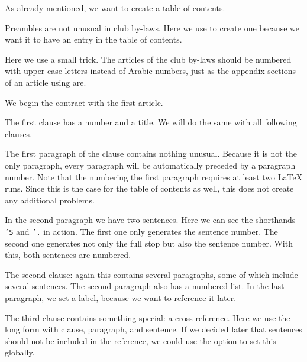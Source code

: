 %
As already mentioned, we want to create a table of contents.

%
Preambles are not unusual in club by-laws. Here we use
 to create one because we want it to have an entry
in the table of contents.

%
Here we use a small trick. The articles of the club by-laws should be numbered
with upper-case letters instead of Arabic numbers, just as 
the appendix sections of an article using  are.

%
We begin the contract with the first article.

%
The first clause has a number and a title. We will do the same with all
following clauses.

The first paragraph of the clause contains nothing unusual. Because it is not
the only paragraph, every paragraph will be automatically preceded by a
paragraph number. Note that the numbering the first paragraph requires at
least two \LaTeX{} runs. Since this is the case for the table of contents as
well, this does not create any additional problems.

In the second paragraph we have two sentences. Here we can see the shorthands
\texttt{'S} and \texttt{'.} in action. The first one only generates the
sentence number. The second one generates not only the full stop but also the
sentence number. With this, both sentences are numbered.

%
The second clause: again this contains several paragraphs, some of which
include several sentences. The second paragraph also has a numbered list. In
the last paragraph, we set a label, because we want to reference it later.

%
The third clause contains something special: a cross-reference. Here we use
the long form with clause, paragraph, and sentence. If we decided later that
sentences should not be included in the reference, we could use the
 option to set this globally.

